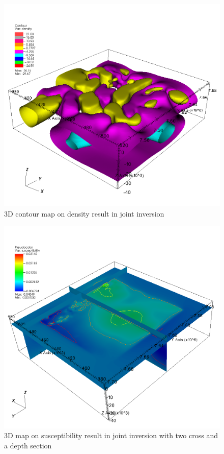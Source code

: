 \begin{figure}
\centering
\includegraphics[width=\textwidth]{jointden11.png}
\caption{3D contour map on density result in joint inversion }
\label{fig:jointden11}
\end{figure}

\begin{figure}
\centering
\includegraphics[width=\textwidth]{jointsus1.png}
\caption{3D map on susceptibility result in joint inversion with two cross and a depth section}
\label{fig:jointsus1}
\end{figure}

